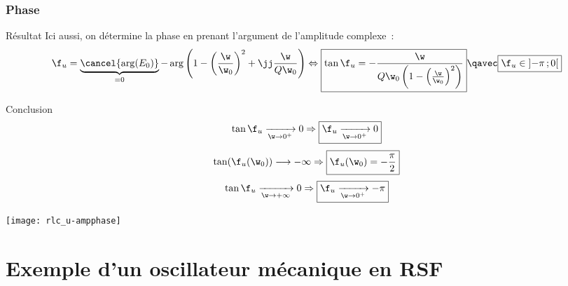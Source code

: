 \documentclass[../main/main.tex]{subfiles}
\begin{document}
\subsubsection{Phase}
\begin{rprop}{Résultat}
    Ici aussi, on détermine la phase en prenant l'argument de l'amplitude complexe~:
    \begin{gather*}
        \f_u = \underbrace{\cancel{\arg(E_0)}}_{=0}
            - \arg \left( 1 - \left(\frac{\w}{\w_0}\right)^2 + \jj \frac{\w}{Q\w_0}\right)
        \Leftrightarrow
        \boxed{
            \tan\f_u = -\frac{\w}{Q\w_0\left(
                1 - \left( \frac{\w}{\w_0}
            \right)^2\right)}
        }
        \qavec
        \boxed{
            \f_u \in \left] -\pi\,; 0 \right[}
    \end{gather*}
\end{rprop}
\begin{rror}{Conclusion}
    \[\tan\f_u \xrightarrow[\w\rightarrow0^+]{} 0
        \Rightarrow
        \boxed{\f_u \xrightarrow[\w\rightarrow0^+]{} 0}
    \]
    \[\tan(\f_u(\w_0)) \longrightarrow -\infty
        \Rightarrow
        \boxed{\f_u(\w_0) = - \frac{\pi}{2}}
    \]
    \[\tan\f_u \xrightarrow[\w\rightarrow+\infty]{} 0
        \Rightarrow
        \boxed{\f_u \xrightarrow[\w\rightarrow0^+]{} - \pi}
    \]
\end{rror}

\begin{center}
    \texttt{[image: rlc\_u-ampphase]}
\end{center}

\section{Exemple d'un oscillateur mécanique en RSF}
\end{document}
